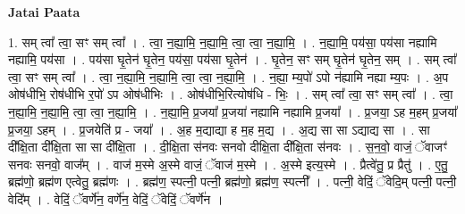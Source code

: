 \documentclass[17pt]{extarticle}
\begin{document}
\textbf{Jatai Paata} \newline

1. सम् त्वा᳚ त्वा॒ सꣳ सम् त्वा᳚ । . त्वा॒ न॒ह्या॒मि॒ न॒ह्या॒मि॒ त्वा॒ त्वा॒ न॒ह्या॒मि॒ । . न॒ह्या॒मि॒ पय॑सा॒ पय॑सा नह्यामि नह्यामि॒ पय॑सा । . पय॑सा घृ॒तेन॑ घृ॒तेन॒ पय॑सा॒ पय॑सा घृ॒तेन॑ । . घृ॒तेन॒ सꣳ सम् घृ॒तेन॑ घृ॒तेन॒ सम् । . सम् त्वा᳚ त्वा॒ सꣳ सम् त्वा᳚ । . त्वा॒ न॒ह्या॒मि॒ न॒ह्या॒मि॒ त्वा॒ त्वा॒ न॒ह्या॒मि॒ । . न॒ह्या॒ म्य॒पो॑ ऽपो न॑ह्यामि नह्या म्य॒पः । . अ॒प ओष॑धीभि॒ रोष॑धीभि र॒पो॑ ऽप ओष॑धीभिः । . ओष॑धीभि॒रित्योष॑धि - भिः॒ । . सम् त्वा᳚ त्वा॒ सꣳ सम् त्वा᳚ । . त्वा॒ न॒ह्या॒मि॒ न॒ह्या॒मि॒ त्वा॒ त्वा॒ न॒ह्या॒मि॒ । . न॒ह्या॒मि॒ प्र॒जया᳚ प्र॒जया॑ नह्यामि नह्यामि प्र॒जया᳚ । . प्र॒जया॒ ऽह म॒हम् प्र॒जया᳚ प्र॒जया॒ ऽहम् । . प्र॒जयेति॑ प्र - जया᳚ । . अ॒ह म॒द्याद्या ह म॒ह म॒द्य । . अ॒द्य सा सा ऽद्याद्य सा । . सा दी᳚क्षि॒ता दी᳚क्षि॒ता सा सा दी᳚क्षि॒ता । . दी॒क्षि॒ता स॑नवः सनवो दीक्षि॒ता दी᳚क्षि॒ता स॑नवः । . स॒न॒वो॒ वाजं॒ ॅवाजꣳ॑ सनवः सनवो॒ वाज᳚म् । . वाज॑ म॒स्मे अ॒स्मे वाजं॒ ॅवाज॑ म॒स्मे । . अ॒स्मे इत्य॒स्मे । . प्रैत्वे॑तु॒ प्र प्रैतु॑ । . ए॒तु॒ ब्रह्म॑णो॒ ब्रह्म॑ण एत्वेतु॒ ब्रह्म॑णः । . ब्रह्म॑ण॒ स्पत्नी॒ पत्नी॒ ब्रह्म॑णो॒ ब्रह्म॑ण॒ स्पत्नी᳚ । . पत्नी॒ वेदिं॒ ॅवेदि॒म् पत्नी॒ पत्नी॒ वेदि᳚म् । . वेदिं॒ ॅवर्णे॑न॒ वर्णे॑न॒ वेदिं॒ ॅवेदिं॒ ॅवर्णे॑न । \newline
\end{document}
